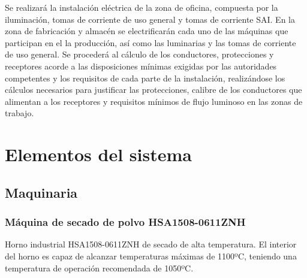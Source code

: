 Se realizará la instalación eléctrica de la zona de oficina, compuesta por la iluminación, tomas de corriente de uso general y tomas de corriente SAI. En la zona de fabricación y almacén se electrificarán cada uno de las máquinas que participan en el la producción, así como las luminarias y las tomas de corriente de uso general. Se procederá al cálculo de los conductores, protecciones y receptores acorde a las disposiciones mínimas exigidas por las autoridades competentes y los requisitos de cada parte de la instalación, realizándose los cálculos necesarios para justificar las protecciones, calibre de los conductores que alimentan a los receptores y requisitos mínimos de flujo luminoso en las zonas de trabajo.

\pagebreak

\section{Elementos del sistema}
\subsection{Maquinaria}
	\subsubsection{Máquina de secado de polvo HSA1508-0611ZNH}

	

	Horno industrial HSA1508-0611ZNH de secado de alta temperatura. El interior del horno es capaz de alcanzar temperaturas máximas de 1100ºC, teniendo una temperatura de operación recomendada de 1050ºC.\\

